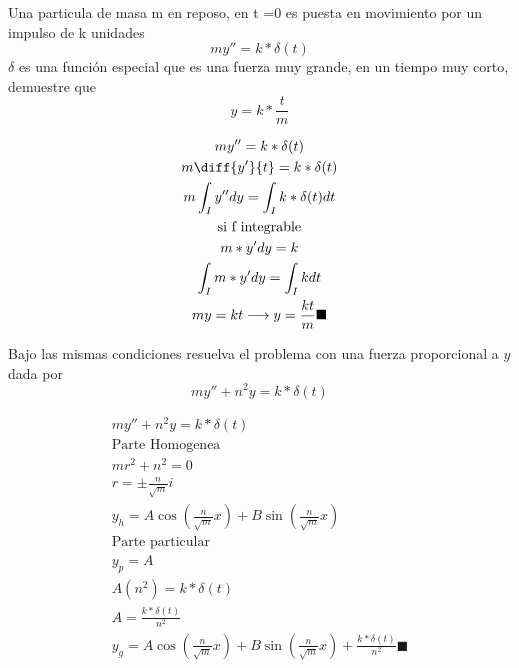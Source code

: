\begin{prob}
   Una particula de masa m en reposo, en t =0 es puesta en movimiento por un impulso de k unidades $$my'' = k* \delta(t)$$ $\delta$ es una función especial que es una fuerza muy grande, en un tiempo muy corto, demuestre que $$y = k*\frac{t}{m}$$  
\end{prob}
\begin{mdframed}

\begin{gather*}
    my'' = k*\delta(t)\\
    m\diff{y'}{t} = k*\delta(t)\\
    m \int_I y'' dy = \int_I k*\delta(t) dt\\
    \text{si f integrable}\\
    m *y' dy =  k\\
    \int_I m *y' dy =  \int_I kdt\\
    my =   kt \longrightarrow y = \frac{kt}{m} \blacksquare\\
\end{gather*}
\end{mdframed}



\begin{prob}
  Bajo las mismas condiciones resuelva el problema con una fuerza proporcional a $y$ dada por $$m y'' +n^2y = k*\delta(t)$$
\end{prob}
    
    \begin{mdframed}
        
        \begin{gather*}
            m y'' +n^2y = k*\delta(t)\\
            \text{Parte Homogenea}\\
            mr^2 +n^2 = 0\\
            r = \pm\frac{n}{\sqrt{m}}i\\
            y_h = A\cos(\frac{n}{\sqrt{m}}x)+B\sin(\frac{n}{\sqrt{m}}x)\\
            \text{Parte particular}\\
            y_p = A \\
            A(n^2)=k*\delta(t)\\
            A = \frac{k*\delta(t)}{n^2}\\
            y_g=A\cos(\frac{n}{\sqrt{m}}x)+B\sin(\frac{n}{\sqrt{m}}x)+\frac{k*\delta(t)}{n^2} \blacksquare
        \end{gather*}
    \end{mdframed}


